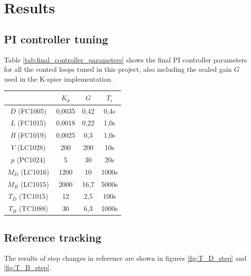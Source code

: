 \documentclass[12pt]{article}
\begin{document}
\newpage
\section{Results}
\subsection{PI controller tuning}
Table \ref{tab:final_controller_parameters} shows the final PI controller parameters for all the control loops tuned in this project, also including the scaled gain $G$ used in the K-spice implementation.

\begin{table}
\centering
\begin{tabular}{c | c | c | c }
& $K_p$ & $G$ & $T_i$ \\ \hline
$D$ (FC1005) & 0,0035 & 0,42& 0,4s\\
$L$ (FC1015) & 0,0018 & 0,22 & 1,0s \\
$B$ (FC1019) & 0,0025 & 0,3 & 1,0s \\
$V$ (LC1028) & 200 & 200 & 10s \\
$p$ (PC1024) & 5 & 30 & 20s \\
$M_D$ (LC1016) & 1200 & 10 & 1000s \\
$M_B$ (LC1015) & 2000 & 16,7 & 5000s \\
$T_D$ (TC1015) & 12 & 2,5 & 100s \\
$T_B$ (TC1088) & 30 & 6,3 & 1000s
\end{tabular}
\end{table}

\subsection{Reference tracking}
The results of step changes in reference are shown in figures \ref{fig:T_D_step} and \ref{fig:T_B_step}.
\end{document}
